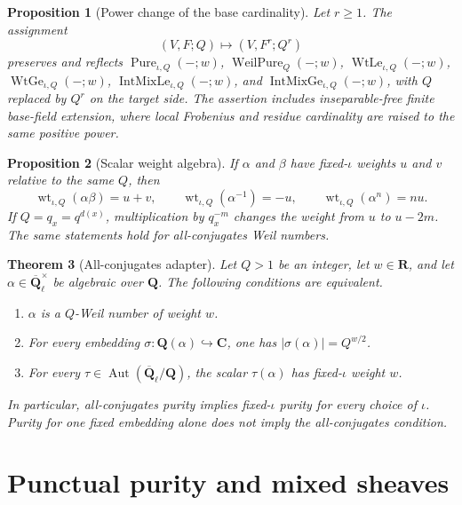 \documentclass[10pt]{article}
\newtheorem{theorem}{Theorem}[section]
\newtheorem{proposition}[theorem]{Proposition}
\theoremstyle{definition}
\newcommand{\Qlb}{\overline{\mathbf Q}_\ell}
\begin{document}
\begin{proposition}[Power change of the base cardinality]
Let \(r\ge1\).  The assignment
\[
                 (V,F;Q)\longmapsto(V,F^r;Q^r)
\]
preserves and reflects
\(\operatorname{Pure}_{\iota,Q}(-;w)\),
\(\operatorname{WeilPure}_{Q}(-;w)\),
\(\operatorname{WtLe}_{\iota,Q}(-;w)\),
\(\operatorname{WtGe}_{\iota,Q}(-;w)\),
\(\operatorname{IntMixLe}_{\iota,Q}(-;w)\), and
\(\operatorname{IntMixGe}_{\iota,Q}(-;w)\), with \(Q\) replaced by
\(Q^r\) on the target side.  The assertion includes inseparable-free
finite base-field extension, where local Frobenius and residue cardinality
are raised to the same positive power.
\end{proposition}

\begin{proposition}[Scalar weight algebra]
If \(\alpha\) and \(\beta\) have fixed-\(\iota\) weights \(u\) and \(v\)
relative to the same \(Q\), then
\[
 \operatorname{wt}_{\iota,Q}(\alpha\beta)=u+v,
 \qquad \operatorname{wt}_{\iota,Q}(\alpha^{-1})=-u,
 \qquad \operatorname{wt}_{\iota,Q}(\alpha^n)=nu.
\]
If \(Q=q_x=q^{d(x)}\), multiplication by \(q_x^{-m}\) changes the weight
from \(u\) to \(u-2m\).  The same statements hold for all-conjugates Weil
numbers.
\end{proposition}

\begin{theorem}[All-conjugates adapter]
Let \(Q>1\) be an integer, let \(w\in\mathbf R\), and let
\(\alpha\in\Qlb^\times\) be algebraic over \(\mathbf Q\).  The following
conditions are equivalent.
\begin{enumerate}
\item \(\alpha\) is a \(Q\)-Weil number of weight \(w\).
\item For every embedding
\(\sigma:\mathbf Q(\alpha)\hookrightarrow\mathbf C\), one has
\(|\sigma(\alpha)|=Q^{w/2}\).
\item For every \(\tau\in\operatorname{Aut}(\Qlb/\mathbf Q)\), the scalar
\(\tau(\alpha)\) has fixed-\(\iota\) weight \(w\).
\end{enumerate}
In particular, all-conjugates purity implies fixed-\(\iota\) purity for
every choice of \(\iota\).  Purity for one fixed embedding alone does not
imply the all-conjugates condition.
\end{theorem}

\section{Punctual purity and mixed sheaves}
\end{document}
